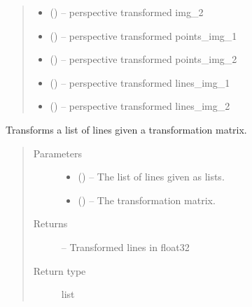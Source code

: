 \documentclass[letterpaper,10pt,english]{sphinxmanual}
\begin{document}
\begin{fulllineitems}
\begin{quote}
\begin{description}
\begin{itemize}
\item {} 
 () -- perspective transformed img\_2

\item {} 
 () -- perspective transformed points\_img\_1

\item {} 
 () -- perspective transformed points\_img\_2

\item {} 
 () -- perspective transformed lines\_img\_1

\item {} 
 () -- perspective transformed lines\_img\_2

\end{itemize}


\end{description}\end{quote}

\end{fulllineitems}


\begin{fulllineitems}
\label{\detokenize{image_perspective_alignment:image_perspective_alignment.transform_lines}}
Transforms a list of lines given a transformation matrix.
\begin{quote}\begin{description}
\item[{Parameters}] \leavevmode\begin{itemize}
\item {} 
 () -- The list of lines given as lists.

\item {} 
 () -- The transformation matrix.

\end{itemize}

\item[{Returns}] \leavevmode
{} -- Transformed lines in float32

\item[{Return type}] \leavevmode
list

\end{description}\end{quote}

\end{fulllineitems}
\end{document}
